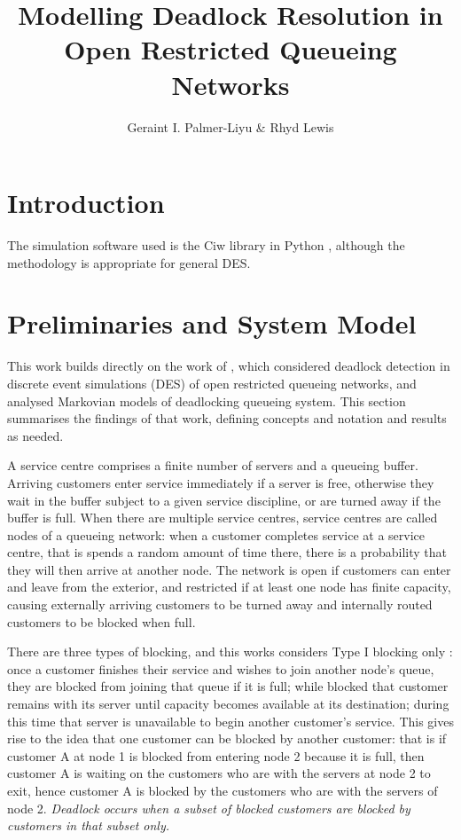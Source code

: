 \documentclass{article}
\title{\bf Modelling Deadlock Resolution in Open Restricted Queueing Networks}
\author{Geraint I. Palmer-Liyu \&  Rhyd Lewis}
\begin{document}
\maketitle

\section{Introduction}\label{sec:introduction}
The simulation software used is the Ciw library in Python \cite{palmer2019ciw},
although the methodology is appropriate for general DES.


\section{Preliminaries and System Model}\label{sec:recap}
This work builds directly on the work of \cite{palmer2018}, which considered
deadlock detection in discrete event simulations (DES) of open restricted
queueing networks, and analysed Markovian models of deadlocking queueing system.
This section summarises the findings of that work, defining concepts and
notation and results as needed.

A service centre comprises a finite number of servers and a queueing buffer.
Arriving customers enter service immediately if a server is free, otherwise they
wait in the buffer subject to a given service discipline, or are turned away if
the buffer is full.
When there are multiple service centres, service centres are called nodes of a
queueing network: when a customer completes service at a service centre, that is
spends a random amount of time there, there is a probability that they will then
arrive at another node.
The network is open if customers can enter and leave from the exterior, and
restricted if at least one node has finite capacity, causing externally arriving
customers to be turned away and internally routed customers to be blocked when
full.

There are three types of blocking, and this works considers Type I blocking
only \cite{onvural1986equivalencies}: once a customer finishes their service
and wishes to join another node's queue, they are blocked from joining that
queue if it is full; while blocked that customer remains with its server until
capacity becomes available at its destination; during this time that server is
unavailable to begin another customer's service.
This gives rise to the idea that one customer can be blocked by another
customer: that is if customer A at node 1 is blocked from entering node 2
because it is full, then customer A is waiting on the customers who are with the
servers at node 2 to exit, hence customer A is blocked by the customers who are
with the servers of node 2.
\textit{Deadlock occurs when a subset of blocked customers are blocked by
customers in that subset only.}
\end{document}
